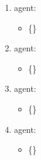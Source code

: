 \begin{enumerate}
\item agent: \agentEGF{}\begin{itemize}\item \{\siter{}{}\}\end{itemize}
\item agent: \agentEGFR{}\begin{itemize}\item \{\sitea{}{}\sitesep\siteb{}{}\sitesep\sitel{}{}\}\end{itemize}
\item agent: \agentShc{}\begin{itemize}\item \{\sitea{}{}\sitesep\siteb{}{}\}\end{itemize}
\item agent: \agentSos{}\begin{itemize}\item \{\sitex{}{}\}\end{itemize}
\end{enumerate}
